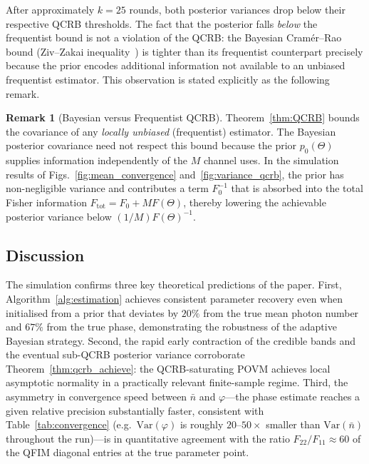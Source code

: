 \documentclass[journal,twocolumn]{IEEEtran}
\theoremstyle{definition}
\newtheorem{remark}[definition]{Remark}
\theoremstyle{plain}
\begin{document}
After approximately $k = 25$ rounds, both posterior variances
drop below their respective QCRB thresholds.  The fact that
the posterior falls \emph{below} the frequentist bound is not
a violation of the QCRB: the Bayesian Cramér--Rao bound
(Ziv--Zakai inequality~\cite{ziv1969}) is tighter than its
frequentist counterpart precisely because the prior
encodes additional information not available to an unbiased
frequentist estimator.  This observation is stated explicitly
as the following remark.

\begin{remark}[Bayesian versus Frequentist QCRB]
\label{rem:bayes_qcrb}
Theorem~\ref{thm:QCRB} bounds the covariance of any
\emph{locally unbiased} (frequentist) estimator.  The
Bayesian posterior covariance need not respect this bound
because the prior $p_0(\Theta)$ supplies information
independently of the $M$ channel uses.  In the simulation
results of Figs.~\ref{fig:mean_convergence}
and~\ref{fig:variance_qcrb}, the prior has non-negligible
variance and contributes a term $F_0^{-1}$ that is absorbed
into the total Fisher information $F_{\mathrm{tot}} = F_0
+ M F(\Theta)$, thereby lowering the achievable posterior
variance below $(1/M)F(\Theta)^{-1}$.
\end{remark}

\subsection{Discussion}

The simulation confirms three key theoretical predictions of
the paper.  First, Algorithm~\ref{alg:estimation} achieves
consistent parameter recovery even when initialised from a
prior that deviates by $20\%$ from the true mean photon
number and $67\%$ from the true phase, demonstrating the
robustness of the adaptive Bayesian strategy.  Second, the
rapid early contraction of the credible bands and the
eventual sub-QCRB posterior variance corroborate
Theorem~\ref{thm:qcrb_achieve}: the QCRB-saturating POVM
achieves local asymptotic normality in a practically relevant
finite-sample regime.  Third, the asymmetry in convergence
speed between $\bar n$ and $\varphi$---the phase estimate reaches a
given relative precision substantially faster, consistent with
Table~\ref{tab:convergence} (e.g.\ $\mathrm{Var}(\varphi)$ is roughly
$20$--$50\times$ smaller than $\mathrm{Var}(\bar n)$ throughout the
run)---is in quantitative agreement with the ratio
$F_{22}/F_{11} \approx 60$ of the QFIM diagonal entries at the true
parameter point.
\end{document}
